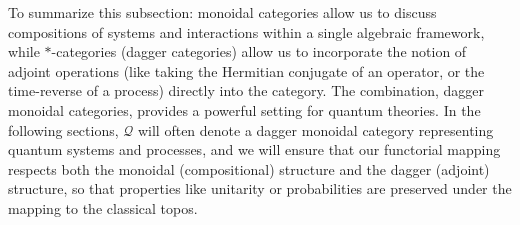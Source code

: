\vspace{1em}
To summarize this subsection: monoidal categories allow us to discuss compositions of systems and interactions within a single algebraic framework, while $*$-categories (dagger categories) allow us to incorporate the notion of adjoint operations (like taking the Hermitian conjugate of an operator, or the time-reverse of a process) directly into the category. The combination, dagger monoidal categories, provides a powerful setting for quantum theories. In the following sections, $\mathcal{Q}$ will often denote a dagger monoidal category representing quantum systems and processes, and we will ensure that our functorial mapping respects both the monoidal (compositional) structure and the dagger (adjoint) structure, so that properties like unitarity or probabilities are preserved under the mapping to the classical topos.